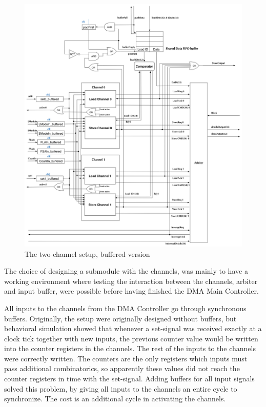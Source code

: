 \begin{appendix}
\begin{figure}[h!]
    \centering
    \includegraphics[width=1.25\textwidth]{Figures/DMA/TwoChannelSetUpBuffered}
    \caption{The two-channel setup, buffered version}
    \label{fig:twoChannelSetup}
\end{figure}

The choice of designing a submodule with the channels, was mainly to have a working environment where testing the interaction between the channels, arbiter and input buffer, were possible before having finished the DMA Main Controller.

All inputs to the channels from the DMA Controller go through synchronous buffers.
Originally, the setup were originally designed without buffers, but behavioral simulation showed that whenever a set-signal was received exactly at a clock tick together with new inputs, the previous counter value would be written into the counter registers in the channels.
The rest of the inputs to the channels were correctly written.
The counters are the only registers which inputs must pass additional combinatorics, so apparently these values did not reach the counter registers in time with the set-signal.
Adding buffers for all input signals solved this problem, by giving all inputs to the channels an entire cycle to synchronize.
The cost is an additional cycle in activating the channels.


\end{appendix}
